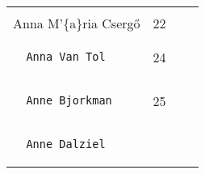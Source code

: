 \documentclass[]{article}
\begin{document}
\begin{longtable}[c]{@{}llll@{}}
\begin{minipage}[t]{0.15\columnwidth}
\end{minipage}
\\\noalign{\medskip}
\begin{minipage}[t]{0.39\columnwidth}\raggedright
Anna M'\{a\}ria Cserg\H{o}
\end{minipage} & \begin{minipage}[t]{0.10\columnwidth}\raggedright
22
\end{minipage} & \begin{minipage}[t]{0.13\columnwidth}\raggedright
\end{minipage} & \begin{minipage}[t]{0.15\columnwidth}\raggedright
\end{minipage}
\\\noalign{\medskip}
\begin{minipage}[t]{0.39\columnwidth}\raggedright
\begin{verbatim}
  Anna Van Tol
\end{verbatim}
\end{minipage} & \begin{minipage}[t]{0.10\columnwidth}\raggedright
24
\end{minipage} & \begin{minipage}[t]{0.13\columnwidth}\raggedright
\end{minipage} & \begin{minipage}[t]{0.15\columnwidth}\raggedright
\end{minipage}
\\\noalign{\medskip}
\begin{minipage}[t]{0.39\columnwidth}\raggedright
\begin{verbatim}
  Anne Bjorkman
\end{verbatim}
\end{minipage} & \begin{minipage}[t]{0.10\columnwidth}\raggedright
25
\end{minipage} & \begin{minipage}[t]{0.13\columnwidth}\raggedright
\end{minipage} & \begin{minipage}[t]{0.15\columnwidth}\raggedright
\end{minipage}
\\\noalign{\medskip}
\begin{minipage}[t]{0.39\columnwidth}\raggedright
\begin{verbatim}
  Anne Dalziel
\end{verbatim}
\end{minipage} & \begin{minipage}[t]{0.10\columnwidth}\raggedright

\end{minipage}
\end{longtable}
\end{document}
